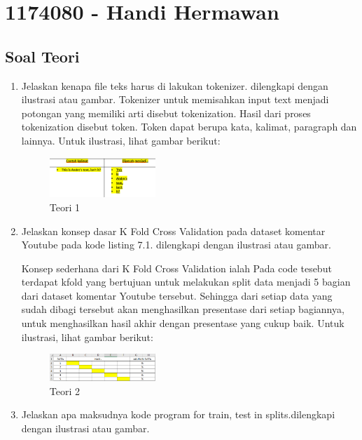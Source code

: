 \section{1174080 - Handi Hermawan}
\subsection{Soal Teori}
\begin{enumerate}

	\item Jelaskan kenapa file teks harus di lakukan tokenizer. dilengkapi dengan ilustrasi atau gambar.
	\hfill\break
	Tokenizer untuk memisahkan input text menjadi potongan yang memiliki arti disebut tokenization. Hasil dari proses tokenization disebut token. Token dapat berupa kata, kalimat, paragraph dan lainnya. Untuk ilustrasi, lihat gambar berikut: 

	\begin{figure}[H]
	\centering
		\includegraphics[width=4cm]{figures/1174080/7/materi/teori1.PNG}
		\caption{Teori 1}
	\end{figure}

	\item Jelaskan konsep dasar K Fold Cross Validation pada dataset komentar Youtube pada kode listing 7.1. dilengkapi dengan ilustrasi atau gambar.

	

	\hfill\break
	Konsep sederhana dari K Fold Cross Validation ialah Pada code tesebut terdapat kfold yang bertujuan untuk melakukan split data menjadi 5 bagian dari dataset komentar Youtube tersebut. Sehingga dari setiap data yang sudah dibagi tersebut akan menghasilkan presentase dari setiap bagiannya, untuk menghasilkan hasil akhir dengan presentase yang cukup baik. Untuk ilustrasi, lihat gambar berikut: 

	\begin{figure}[H]
	\centering
		\includegraphics[width=4cm]{figures/1174080/7/materi/teori2.PNG}
		\caption{Teori 2}
	\end{figure}
	
	\item Jelaskan apa maksudnya kode program for train, test in splits.dilengkapi dengan ilustrasi atau gambar.


\end{enumerate}
